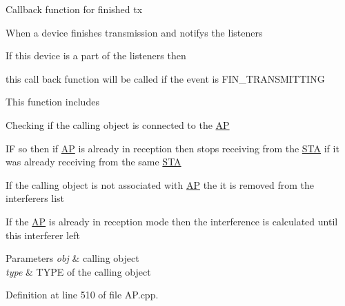 Callback function for finished tx \par
When a device finishes transmission and notifys the listeners \par
If this device is a part of the listeners then \par
this call back function will be called if the event is F\-I\-N\-\_\-\-T\-R\-A\-N\-S\-M\-I\-T\-T\-I\-N\-G \par
This function includes \par

\begin{DoxyEnumerate}
\item Checking if the calling object is connected to the \hyperlink{classAP}{A\-P} \par

\item I\-F so then if \hyperlink{classAP}{A\-P} is already in reception then stops receiving from the \hyperlink{classSTA}{S\-T\-A} if it was already receiving from the same \hyperlink{classSTA}{S\-T\-A} \par

\item If the calling object is not associated with \hyperlink{classAP}{A\-P} the it is removed from the interferers list \par

\item If the \hyperlink{classAP}{A\-P} is already in reception mode then the interference is calculated until this interferer left \par

\begin{DoxyParams}{Parameters}
{\em obj} & calling object \\
\hline
{\em type} & T\-Y\-P\-E of the calling object \\
\hline
\end{DoxyParams}

\end{DoxyEnumerate}

Definition at line 510 of file A\-P.\-cpp.


